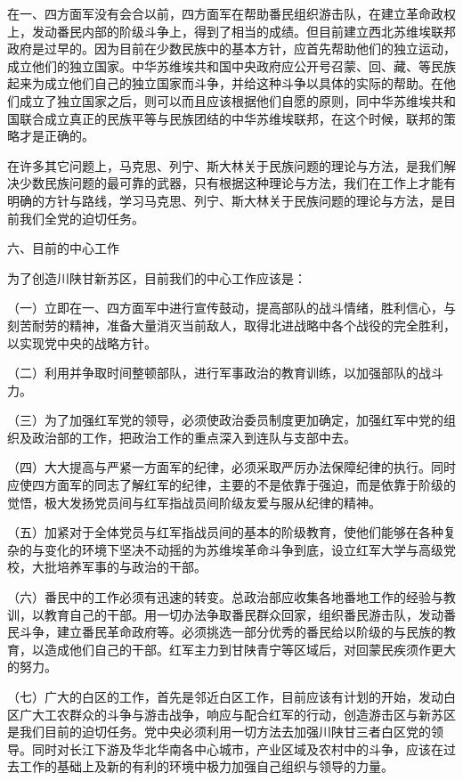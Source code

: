 在一、四方面军没有会合以前，四方面军在帮助番民组织游击队，在建立革命政权上，发动番民内部的阶级斗争上，得到了相当的成绩。但目前建立西北苏维埃联邦政府是过早的。因为目前在少数民族中的基本方针，应首先帮助他们的独立运动，成立他们的独立国家。中华苏维埃共和国中央政府应公开号召蒙、回、藏、等民族起来为成立他们自己的独立国家而斗争，并给这种斗争以具体的实际的帮助。在他们成立了独立国家之后，则可以而且应该根据他们自愿的原则，同中华苏维埃共和国联合成立真正的民族平等与民族团结的中华苏维埃联邦，在这个时候，联邦的策略才是正确的。

在许多其它问题上，马克思、列宁、斯大林关于民族问题的理论与方法，是我们解决少数民族问题的最可靠的武器，只有根据这种理论与方法，我们在工作上才能有明确的方针与路线，学习马克思、列宁、斯大林关于民族问题的理论与方法，是目前我们全党的迫切任务。

六、目前的中心工作

为了创造川陕甘新苏区，目前我们的中心工作应该是：

（一）立即在一、四方面军中进行宣传鼓动，提高部队的战斗情绪，胜利信心，与刻苦耐劳的精神，准备大量消灭当前敌人，取得北进战略中各个战役的完全胜利，以实现党中央的战略方针。

（二）利用并争取时间整顿部队，进行军事政治的教育训练，以加强部队的战斗力。

（三）为了加强红军党的领导，必须使政治委员制度更加确定，加强红军中党的组织及政治部的工作，把政治工作的重点深入到连队与支部中去。

（四）大大提高与严紧一方面军的纪律，必须采取严厉办法保障纪律的执行。同时应使四方面军的同志了解红军的纪律，主要的不是依靠于强迫，而是依靠于阶级的觉悟，极大发扬党员间与红军指战员间阶级友爱与服从纪律的精神。

（五）加紧对于全体党员与红军指战员间的基本的阶级教育，使他们能够在各种复杂的与变化的环境下坚决不动摇的为苏维埃革命斗争到底，设立红军大学与高级党校，大批培养军事的与政治的干部。

（六）番民中的工作必须有迅速的转变。总政治部应收集各地番地工作的经验与教训，以教育自己的干部。用一切办法争取番民群众回家，组织番民游击队，发动番民斗争，建立番民革命政府等。必须挑选一部分优秀的番民给以阶级的与民族的教育，以造成他们自己的干部。红军主力到甘陕青宁等区域后，对回蒙民疾须作更大的努力。

（七）广大的白区的工作，首先是邻近白区工作，目前应该有计划的开始，发动白区广大工农群众的斗争与游击战争，响应与配合红军的行动，创造游击区与新苏区是我们目前的迫切任务。党中央必须利用一切方法去加强川陕甘三者白区党的领导。同时对长江下游及华北华南各中心城市，产业区域及农村中的斗争，应该在过去工作的基础上及新的有利的环境中极力加强自己组织与领导的力量。

